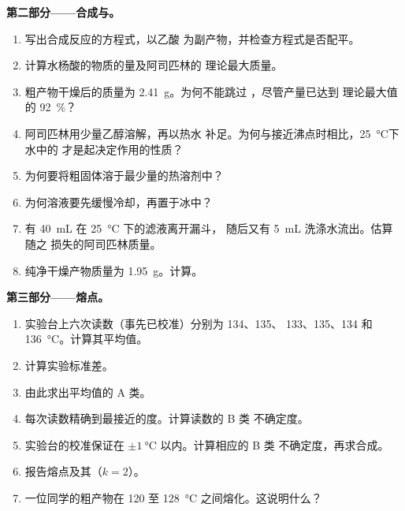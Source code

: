 \begin{problem}
\noindent\textbf{第二部分——合成与。}
\begin{enumerate}[resume]
  \item 写出合成反应的方程式，以乙酸
         为副产物，并检查方程式是否配平。
  \item 计算水杨酸的物质的量及阿司匹林的
        理论最大质量。
  \item 粗产物干燥后的质量为 \qty{2.41}{g}。为何不能跳过
        ，尽管产量已达到
        理论最大值的 \qty{92}{\percent}？
  \item 阿司匹林用少量乙醇溶解，再以热水
        补足。为何与接近沸点时相比，\qty{25}{\celsius}下水中的
        才是起决定作用的性质？
  \item 为何要将粗固体溶于最少量的热溶剂中？
  \item 为何溶液要先缓慢冷却，再置于冰中？
  \item 有 \qty{40}{mL} 在 \qty{25}{\celsius} 下的滤液离开漏斗，
        随后又有 \qty{5}{mL} 洗涤水流出。估算随之
        损失的阿司匹林质量。
  \item 纯净干燥产物质量为 \qty{1.95}{g}。计算。
\end{enumerate}

\noindent\textbf{第三部分——熔点。}
\begin{enumerate}[resume]
  \item 实验台上六次读数（事先已校准）分别为 134、135、
        133、135、134 和 \qty{136}{\celsius}。计算其平均值。
  \item 计算实验标准差。
  \item 由此求出平均值的 A 类。
  \item 每次读数精确到最接近的度。计算读数的 B 类
        不确定度。
  \item 实验台的校准保证在
        $\pm\qty{1}{\celsius}$ 以内。计算相应的 B 类
        不确定度，再求合成。
  \item 报告熔点及其（$k = 2$）。
  \item 一位同学的粗产物在 120 至
        \qty{128}{\celsius} 之间熔化。这说明什么？
\end{enumerate}


\end{problem}
